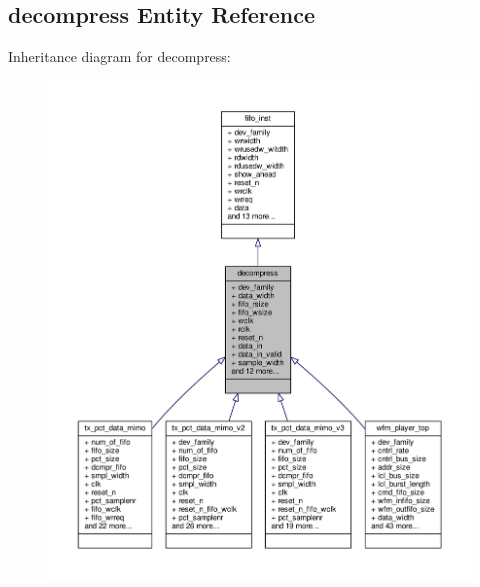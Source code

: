 \subsection{decompress Entity Reference}
\label{classdecompress}


Inheritance diagram for decompress\+:\nopagebreak
\begin{figure}[H]
\begin{center}
\leavevmode
\includegraphics[width=350pt]{d6/de7/classdecompress__inherit__graph}
\end{center}
\end{figure}


